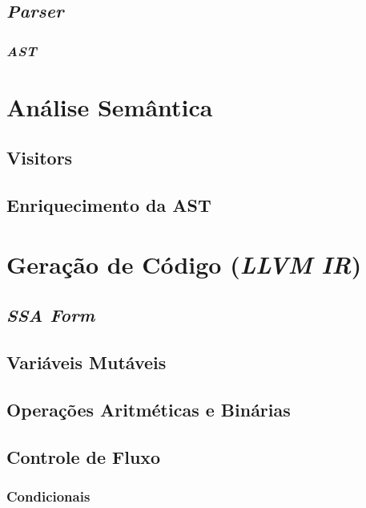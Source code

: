 \documentclass[11pt, oneside, titlepage]{report}
\begin{document}
        \subsection{\textit{Parser}}

          \subsubsection{\textit{AST}}

      \section{Análise Semântica}

        \subsection{Visitors}

        \subsection{Enriquecimento da AST}

      \section{Geração de Código \small(\textit{LLVM IR})}

        \subsection{\textit{SSA Form}}

        \subsection{Variáveis Mutáveis}

        \subsection{Operações Aritméticas e Binárias}

        \subsection{Controle de Fluxo}

          \subsubsection{Condicionais}
\end{document}
